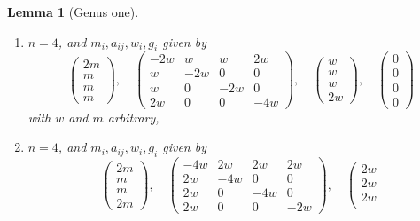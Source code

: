 \documentclass{stacks-project}
\theoremstyle{plain}
\newtheorem{lemma}[subsection]{Lemma}
\theoremstyle{definition}
\theoremstyle{remark}
\numberwithin{equation}{subsection}
\begin{document}
\begin{lemma}[Genus one]
\begin{enumerate}
$$\begin{matrix}
w \\
2w
\end{matrix}
\right),
\quad
\left(
\begin{matrix}
0 \\
0 \\
0 \\
0
\end{matrix}
\right)
$$
with $w$ and $m$ arbitrary,
\item
\label{item-triple-with-up}
$n = 4$, and $m_i, a_{ij}, w_i, g_i$ given by
$$
\left(
\begin{matrix}
2m \\
m \\
m \\
m
\end{matrix}
\right),
\quad
\left(
\begin{matrix}
-2w & w & w & 2w \\
w & -2w & 0 & 0 \\
w & 0 & -2w & 0 \\
2w & 0 & 0 & -4w
\end{matrix}
\right),
\quad
\left(
\begin{matrix}
w \\
w \\
w \\
2w
\end{matrix}
\right),
\quad
\left(
\begin{matrix}
0 \\
0 \\
0 \\
0
\end{matrix}
\right)
$$
with $w$ and $m$ arbitrary,
\item
\label{item-triple-with-down}
$n = 4$, and $m_i, a_{ij}, w_i, g_i$ given by
$$
\left(
\begin{matrix}
2m \\
m \\
m \\
2m
\end{matrix}
\right),
\quad
\left(
\begin{matrix}
-4w & 2w & 2w & 2w \\
2w & -4w & 0 & 0 \\
2w & 0 & -4w & 0 \\
2w & 0 & 0 & -2w
\end{matrix}
\right),
\quad
\left(
\begin{matrix}
2w \\
2w \\
2w \\

\end{matrix}$$
\end{enumerate}
\end{lemma}
\end{document}
